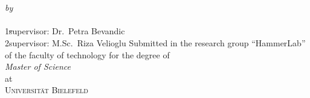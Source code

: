 \begin{titlepage}
  \vspace*{5cm}
  \makeatletter
  \begin{center}
    \begin{Huge}
      \@title
    \end{Huge}\\[0.1cm]
    \begin{Large}
      \@subtitle
    \end{Large}\\
    \emph{by}\\
    \@author\\
    \vspace{1cm}
    1\st supervisor:
    Dr.~Petra Bevandic\\
    2\nd supervisor:
    M.Sc.~Riza Velioglu
    \vfill
    Submitted in the research group \enquote{HammerLab}\\
    of the faculty of technology for the degree of\\
    \emph{Master of Science}\\
    at\\
    \textsc{Universität Bielefeld}
    \vspace{0.5cm}\\
    \emph{\@date}
  \end{center}
  \makeatother
\end{titlepage}

\newpage
\null
\thispagestyle{empty}
\newpage
